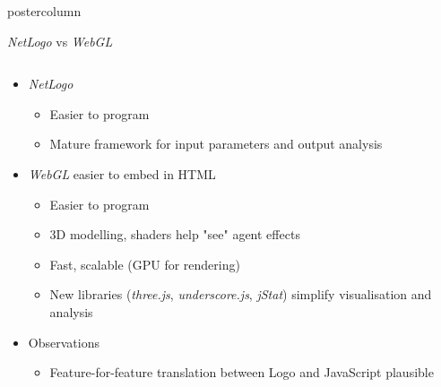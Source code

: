 \documentclass[final,hyperref={pdfpagelabels=false}]{beamer}
\newlength{\columnheight}
\begin{document}
\begin{frame}
\begin{columns}
    \begin{column}{.33\textwidth}
      \begin{beamercolorbox}[center,wd=\textwidth]{postercolumn}
        \begin{minipage}[T]{.95\textwidth} %
          \parbox[t][\columnheight]{\textwidth}{ %

            \vfill
            \begin{block}{\textit{NetLogo} vs \textit{WebGL}}
              \begin{columns}
                \begin{column}{.99\textwidth}
                  \begin{itemize}
                    \item \textit{NetLogo}
                      \begin{itemize}
                        \item Easier to program
                        \item Mature framework for input parameters and output analysis
                      \end{itemize}
                    \item \textit{WebGL} easier to embed in HTML
                      \begin{itemize}
                        \item Easier to program
                        \item 3D modelling, shaders help "see" agent effects
                        \item Fast, scalable (GPU for rendering)
                        \item New libraries (\textit{three.js}, \textit{underscore.js}, \textit{jStat}) simplify visualisation and analysis
                      \end{itemize}
                    \item Observations
                      \begin{itemize}
                        \item Feature-for-feature translation between Logo and JavaScript plausible

\end{itemize}
\end{itemize}
\end{column}
\end{columns}
\end{block}}
\end{minipage}
\end{beamercolorbox}
\end{column}
\end{columns}
\end{frame}
\end{document}
